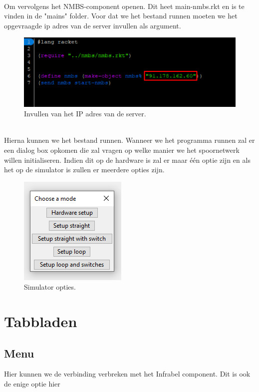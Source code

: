 \documentclass{article}
\begin{document}
\\
Om vervolgens het NMBS-component openen. Dit heet main-nmbs.rkt en is te vinden in de "mains" folder. 
Voor dat we het bestand runnen moeten we het opgevraagde ip adres van de server invullen als argument.\\
\begin{figure}[h]
    \centering
    \includegraphics[width=\textwidth]{Images/Screenshot_1.png}
    \caption{Invullen van het IP adres van de server.}
\end{figure}
\\
Hierna kunnen we het bestand runnen. Wanneer we het programma runnen zal er een dialog box opkomen die zal vragen 
op welke manier we het spoornetwerk willen initialiseren. Indien dit op de hardware is zal er maar één optie zijn en als het op
de simulator is zullen er meerdere opties zijn. 
\begin{figure}[h]
    \centering
    \includegraphics{Images/Screenshot_3.png}
    \caption{Simulator opties.}
\end{figure}
\section{Tabbladen}
\subsection{Menu}
Hier kunnen we de verbinding verbreken met het Infrabel component. Dit is ook de enige optie hier
\end{document}
